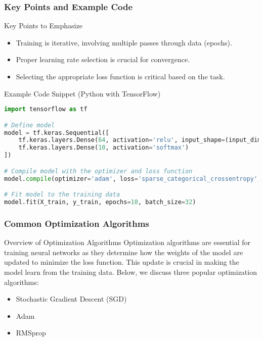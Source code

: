 \documentclass[aspectratio=169]{beamer}
\begin{document}
\begin{frame}[fragile]
    \frametitle{Key Points and Example Code}
    \begin{block}{Key Points to Emphasize}
        \begin{itemize}
            \item Training is iterative, involving multiple passes through data (epochs).
            \item Proper learning rate selection is crucial for convergence.
            \item Selecting the appropriate loss function is critical based on the task.
        \end{itemize}
    \end{block}
    
    \begin{block}{Example Code Snippet (Python with TensorFlow)}
    \begin{lstlisting}[language=Python]
import tensorflow as tf

# Define model
model = tf.keras.Sequential([
    tf.keras.layers.Dense(64, activation='relu', input_shape=(input_dim,)),
    tf.keras.layers.Dense(10, activation='softmax')
])

# Compile model with the optimizer and loss function
model.compile(optimizer='adam', loss='sparse_categorical_crossentropy', metrics=['accuracy'])

# Fit model to the training data
model.fit(X_train, y_train, epochs=10, batch_size=32)
    \end{lstlisting}
    \end{block}
\end{frame}

\begin{frame}[fragile]
    \frametitle{Common Optimization Algorithms}
    \begin{block}{Overview of Optimization Algorithms}
        Optimization algorithms are essential for training neural networks as they determine how the weights of the model are updated to minimize the loss function. This update is crucial in making the model learn from the training data. Below, we discuss three popular optimization algorithms: 
        \begin{itemize}
            \item Stochastic Gradient Descent (SGD)
            \item Adam
            \item RMSprop
        \end{itemize}
    \end{block}
\end{frame}
\end{document}
